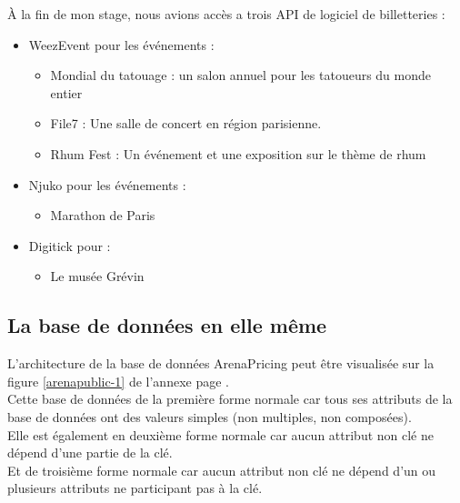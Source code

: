 À la fin de mon stage, nous avions accès a trois API de logiciel de billetteries : 
\begin{itemize}
  \item[\textbullet] WeezEvent pour les événements :
  \begin{itemize}
	\item Mondial du tatouage : un salon annuel pour les tatoueurs du monde entier
	\item File7 : Une salle de concert en région parisienne. 
	\item Rhum Fest : Un événement et une exposition sur le thème de rhum
  \end{itemize}
  \item[\textbullet] Njuko pour les événements :
  \begin{itemize}
  	\item Marathon de Paris
  \end{itemize}
  \item[\textbullet] Digitick pour :
  \begin{itemize}
  	\item Le musée Grévin
  \end{itemize}

\end{itemize}

\subsection{La base de données en elle même}
L'architecture de la base de données ArenaPricing peut être visualisée sur la figure \ref{arenapublic-1} de l'annexe page \pageref{arenapublic-1}.
\\

Cette base de données de la première forme normale car tous ses attributs de la base de données ont des valeurs simples (non multiples, non composées).
\\

Elle est également en deuxième forme normale car aucun attribut non clé ne dépend d'une partie de la clé.
\\

Et de troisième forme normale car aucun attribut non clé ne dépend d'un ou plusieurs attributs ne participant pas à la clé.




		